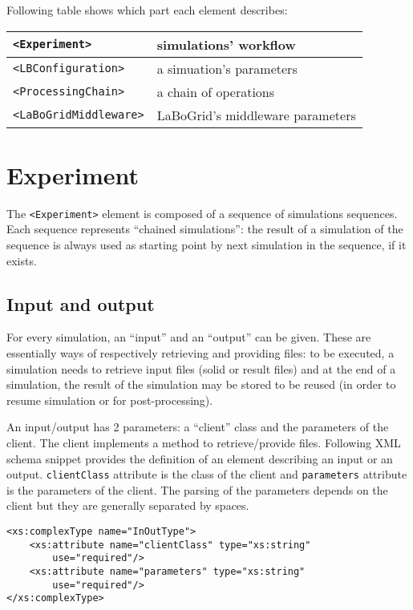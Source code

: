 Following table shows which part each element describes:

\begin{tabular}{|l|l|}
\hline
\verb|<Experiment>| & simulations' workflow\\
\hline
\verb|<LBConfiguration>| & a simuation's parameters \\
\hline
\verb|<ProcessingChain>| & a chain of operations \\
\hline
\verb|<LaBoGridMiddleware>| & LaBoGrid's middleware parameters \\
\hline
\end{tabular}


\section{Experiment}
\label{sec_conf_exp}

The \verb|<Experiment>| element is composed of a sequence of
simulations sequences. Each sequence represents ``chained simulations'':
the result of a simulation of the sequence is always used as starting point by
next simulation in the sequence, if it exists.


\subsection{Input and output}
\label{sec_conf_exp_io}

For every simulation, an ``input'' and an ``output'' can be given. These are
essentially ways of respectively retrieving and providing files: to be
executed, a simulation needs to retrieve input files (solid or result files) and
at the end of a simulation, the result of the simulation may be stored to be reused
(in order to resume simulation or for post-processing).

An input/output has 2 parameters: a ``client'' class and 
the parameters of the client. The client implements a method to retrieve/provide
files. Following XML schema snippet provides the definition of an element
describing an input or an output. \texttt{clientClass} attribute is the class of
the client and \texttt{parameters} attribute is the parameters of the client.
The parsing of the parameters depends on the client but they are generally
separated by spaces.

\begin{Verbatim}[tabsize=2,frame=lines]
<xs:complexType name="InOutType">
	<xs:attribute name="clientClass" type="xs:string"
		use="required"/>
	<xs:attribute name="parameters" type="xs:string"
		use="required"/>
</xs:complexType>
\end{Verbatim}

